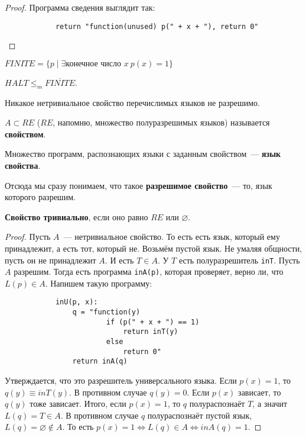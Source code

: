 \documentclass{article}
\begin{document}
    \begin{proof}
        Программа сведения выглядит так:
        \begin{verbatim}
            return "function(unused) p(" + x + "), return 0"
        \end{verbatim}
    \end{proof}
    \begin{definition}
        $FINITE=\{p\mid\exists\text{конечное число }x~p(x)=1\}$
    \end{definition}
    \begin{claim}
        $HALT\leqslant_m\overline{FINITE}$.
    \end{claim}
    \begin{theorem}
        Никакое нетривиальное свойство перечислимых языков не разрешимо.
    \end{theorem}
    \begin{definition}
        $A\subset RE$ ($RE$, напомню, множество полуразрешимых языков) называется \textbf{свойством}.
    \end{definition}
    \begin{definition}
        Множество программ, распознающих языки с заданным свойством~--- \textbf{язык свойства}.
    \end{definition}
    \begin{definition}
        Отсюда мы сразу понимаем, что такое \textbf{разрешимое свойство}~--- то, язык которого разрешим.
    \end{definition}
    \begin{definition}
        \textbf{Свойство тривиально}, если оно равно $RE$ или $\varnothing$.
    \end{definition}
    \begin{proof}
        Пусть $A$~--- нетривиальное свойство. То есть есть язык, который ему принадлежит, а есть тот, который не. Возьмём пустой язык. Не умаляя общности, пусть он не принадлежит $A$. И есть $T\in A$. У $T$ есть полуразрешитель \Verb|inT|. Пусть $A$ разрешим. Тогда есть программа \Verb|inA(p)|, которая проверяет, верно ли, что $L(p)\in A$. Напишем такую программу:
        \begin{verbatim}
            inU(p, x):
                q = "function(y)
                        if (p(" + x + ") == 1)
                            return inT(y)
                        else
                            return 0"
                return inA(q)
        \end{verbatim}
        Утверждается, что это разрешитель универсального языка. Если $p(x)=1$, то $q(y)\equiv inT(y)$. В противном случае $q(y)=0$. Если $p(x)$ зависает, то $q(y)$ тоже зависает. Итого, если $p(x)=1$, то $q$ полураспознаёт $T$, а значит $L(q)=T\in A$. В противном случае $q$ полураспознаёт пустой язык, $L(q)=\varnothing\notin A$. То есть $p(x)=1\Leftrightarrow L(q)\in A\Leftrightarrow inA(q)=1$.
    \end{proof}
\end{document}
